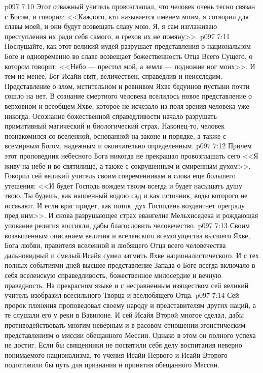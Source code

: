 \vs p097 7:10 Этот отважный учитель провозглашал, что человек очень тесно связан с Богом, и говорил: <<Каждого, кто называется именем моим, я сотворил для славы моей, и они будут возвещать славу мою. Я, я сам изглаживаю преступления их ради себя самого, и грехов их не помяну>>.
\vs p097 7:11 Послушайте, как этот великий иудей разрушает представления о национальном Боге и одновременно во славе возвещает божественность Отца Всего Сущего, о котором говорит: <<Небо --- престол мой, а земля --- подножие ног моих>>. И тем не менее, Бог Исайи свят, величествен, справедлив и неисследим. Представление о злом, мстительном и ревнивом Яхве бедуинов пустыни почти сошло на нет. В сознание смертного человека вселилось новое представление о верховном и всеобщем Яхве, которое не исчезало из поля зрения человека уже никогда. Осознание божественной справедливости начало разрушать примитивный магический и биологический страх. Наконец\hyp{}то, человек познакомился со вселенной, основанной на законе и порядке, а также с всемирным Богом, надежным и окончательно определенным.
\vs p097 7:12 Причем этот проповедник небесного Бога никогда не прекращал провозглашать сего  <<Я живу на небе и во святилище, а также с сокрушенным и смиренным духом>>. Говорил сей великий учитель своим современникам и слова еще большего утешения: <<И будет Господь вождем твоим всегда и будет насыщать душу твою. Ты будешь, как напоенный водою сад и как источник, воды которого не иссякают. И если враг придет, как поток, дух Господень воздвигнет преграду пред ним>>. И снова разрушающее страх евангелие Мельхиседека и рождающая упование религия воссияли, дабы благословить человечество.
\vs p097 7:13 Своим возвышенным описанием величия и вселенского всемогущества высшего Яхве, Бога любви, правителя вселенной и любящего Отца всего человечества дальновидный и смелый Исайя сумел затмить Яхве националистического. И с тех полных событиями дней высшее представление Запада о Боге всегда включало в себя вселенскую справедливость, божественное милосердие и вечную праведность. На прекрасном языке и с несравненным изяществом сей великий учитель изобразил всесильного Творца и вселюбящего Отца.
\vs p097 7:14 Сей пророк пленения проповедовал своему народу и представителям других наций, а те слушали его у реки в Вавилоне. И сей Исайя Второй многое сделал, дабы противодействовать многим неверным и в расовом отношении эгоистическим представлениям о миссии обещанного Мессии. Однако в этом он полного успеха не достиг. Если бы священники не посвятили себя делу воспитания неверно понимаемого национализма, то учения Исайи Первого и Исайи Второго подготовили бы путь для признания и принятия обещанного Мессии.
